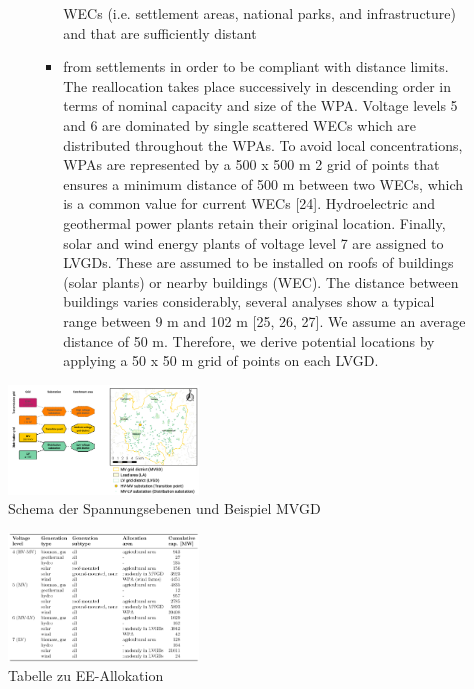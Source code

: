 \documentclass[
a4paper,     %
12pt         %
]{scrartcl}  %
\begin{document}
\begin{itemize}
\begin{itemize}
\begin{itemize}
\begin{itemize}
				WECs (i.e. settlement areas, national parks, and infrastructure) and that are sufficiently distant
				\item from settlements in order to be compliant with distance limits. The reallocation takes place
				successively in descending order in terms of nominal capacity and size of the WPA. Voltage
				levels 5 and 6 are dominated by single scattered WECs which are distributed throughout the
				WPAs. To avoid local concentrations, WPAs are represented by a 500 x 500 m 2 grid of points
				that ensures a minimum distance of 500 m between two WECs, which is a common value for
				current WECs [24]. Hydroelectric and geothermal power plants retain their original location.
				Finally, solar and wind energy plants of voltage level 7 are assigned to LVGDs. These are
				assumed to be installed on roofs of buildings (solar plants) or nearby buildings (WEC). The
				distance between buildings varies considerably, several analyses show a typical range between
				9 m and 102 m [25, 26, 27]. We assume an average distance of 50 m. Therefore, we derive
				potential locations by applying a 50 x 50 m grid of points on each LVGD.
			\end{itemize}
		\end{itemize}
	\end{itemize}
\end{itemize}


\begin{figure}[H]
	\label{MVGD-struct1}
	\includegraphics[width=0.45\textwidth]{Abb/sc_MVGD-structure1.png}
	\caption{Schema der Spannungsebenen und Beispiel MVGD}
\end{figure}

\begin{figure}[H]
	\label{EE-alloc}	
	\caption{Tabelle zu EE-Allokation}
	\includegraphics[width=0.45\textwidth]{Abb/sc_EE-alloc.png}

\end{figure}
\end{document}
